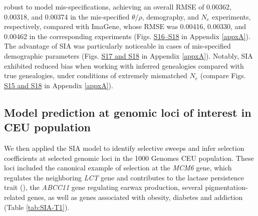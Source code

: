 robust to model mis-specifications, achieving an overall \ac{RMSE} of 0.00362, 0.00318, and 0.00374 in the mis-specified $\theta/\rho$, demography, and $N_e$ experiments, respectively, compared with ImaGene, whose \ac{RMSE} was 0.00416, 0.00330, and 0.00462 in the corresponding experiments (Figs. \href{https://academic.oup.com/mbe/article/39/1/msab332/6433161?login=true#supplementary-data}{S16–S18} in Appendix \ref{appxA}). The advantage of \ac{SIA} was particularly noticeable in cases of mis-specified demographic parameters (Figs. \href{https://academic.oup.com/mbe/article/39/1/msab332/6433161?login=true#supplementary-data}{S17 and S18} in Appendix \ref{appxA}). Notably, \ac{SIA} exhibited reduced bias when working with inferred genealogies compared with true genealogies, under conditions of extremely mismatched $N_e$ (compare Figs. \href{https://academic.oup.com/mbe/article/39/1/msab332/6433161?login=true#supplementary-data}{S15 and S18} in Appendix \ref{appxA}).

\subsection{Model prediction at genomic loci of interest in CEU population}
We then applied the \ac{SIA} model to identify selective sweeps and infer selection coefficients at selected genomic loci in the 1000 Genomes CEU population. These loci included the canonical example of selection at the \textit{MCM6} gene, which regulates the neighboring \textit{LCT} gene and contributes to the lactase persistence trait (\cite{bersaglieri_genetic_2004}), the \textit{ABCC11} gene regulating earwax production, several pigmentation-related genes, as well as genes associated with obesity, diabetes and addiction (Table \ref{tab:SIA-T1}).


